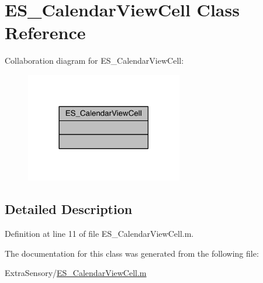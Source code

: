 \hypertarget{class_e_s___calendar_view_cell}{\section{E\+S\+\_\+\+Calendar\+View\+Cell Class Reference}
\label{class_e_s___calendar_view_cell}
}


Collaboration diagram for E\+S\+\_\+\+Calendar\+View\+Cell\+:\nopagebreak
\begin{figure}[H]
\begin{center}
\leavevmode
\includegraphics[width=194pt]{d2/d2d/class_e_s___calendar_view_cell__coll__graph}
\end{center}
\end{figure}


\subsection{Detailed Description}


Definition at line 11 of file E\+S\+\_\+\+Calendar\+View\+Cell.\+m.



The documentation for this class was generated from the following file\+:\begin{DoxyCompactItemize}
\item 
Extra\+Sensory/\hyperlink{_e_s___calendar_view_cell_8m}{E\+S\+\_\+\+Calendar\+View\+Cell.\+m}\end{DoxyCompactItemize}
